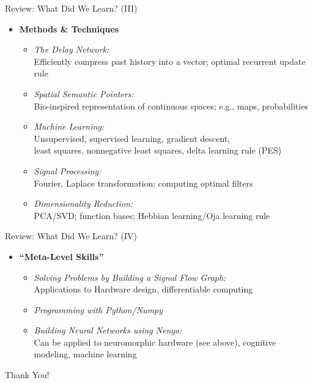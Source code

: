 \documentclass[handout,aspectratio=169]{beamer}
\begin{document}
\begin{frame}{Review: What Did We Learn? (III)}
	\begin{itemize}
		\item \textbf{Methods \& Techniques}\\[0.25cm]
		\begin{itemize}
			\setlength{\itemsep}{0.25cm}
			\item \emph{The Delay Network:}\\
			Efficiently compress past history into a vector; optimal recurrent update rule
      \item \emph{Spatial Semantic Pointers:}\\
			Bio-inspired representation of continuous spaces; e.g., maps, probabilities
      \item \emph{Machine Learning:}\\
			Unsupervised, supervised learning, gradient descent,\\least squares, nonnegative least squares, delta learning rule (PES)
			\item \emph{Signal Processing:}\\
			Fourier, Laplace transformation; computing optimal filters
			\item \emph{Dimensionality Reduction:}\\
			PCA/SVD; function bases; Hebbian learning/Oja learning rule
		\end{itemize}
	\end{itemize}
\end{frame}


\begin{frame}{Review: What Did We Learn? (IV)}
	\begin{itemize}
		\item \textbf{\enquote{Meta-Level Skills}}\\[0.25cm]
		\begin{itemize}
			\setlength{\itemsep}{0.5cm}
			\item \emph{Solving Problems by Building a Signal Flow Graph:}\\
			Applications to Hardware design, differentiable computing
			\item \emph{Programming with Python/Numpy}
			\item \emph{Building Neural Networks using Nengo:}\\
			Can be applied to neuromorphic hardware (see above), cognitive modeling, machine learning
		\end{itemize}
	\end{itemize}
\end{frame}

\begin{frame}{}
	\centering
	{\Huge Thank You!}
\end{frame}
\end{document}
